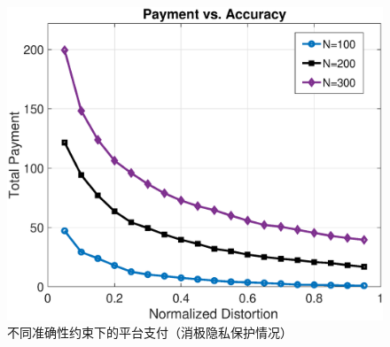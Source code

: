 	
	\begin{figure}[!t]
			\centering
			\includegraphics[scale=0.5]{./pic/payment_vs_accuracy5.eps}
			\caption{不同准确性约束下的平台支付（消极隐私保护情况）}\label{fg:payment}
	\end{figure}
